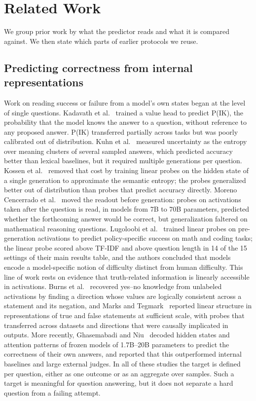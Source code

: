 \documentclass[11pt]{article}
\begin{document}
\section{Related Work}
We group prior work by what the predictor reads and what it is compared against. We then state which parts of earlier protocols we reuse.

\subsection{Predicting correctness from internal representations}
Work on reading success or failure from a model's own states began at the level of single questions. Kadavath et al.~\cite{kadavath2022know} trained a value head to predict P(IK), the probability that the model knows the answer to a question, without reference to any proposed answer.
P(IK) transferred partially across tasks but was poorly calibrated out of distribution. Kuhn et al.~\cite{kuhn2023semantic} measured uncertainty as the entropy over meaning clusters of several sampled answers, which predicted accuracy better than lexical baselines, but it required multiple generations per question.
Kossen et al.~\cite{kossen2024sep} removed that cost by training linear probes on the hidden state of a single generation to approximate the semantic entropy; the probes generalized better out of distribution than probes that predict accuracy directly.
Moreno Cencerrado et al.~\cite{moreno2026noanswer} moved the readout before generation: probes on activations taken after the question is read, in models from 7B to 70B parameters, predicted whether the forthcoming answer would be correct, but generalization faltered on mathematical reasoning questions.
Lugoloobi et al.~\cite{lugoloobi2026failures} trained linear probes on pre-generation activations to predict policy-specific success on math and coding tasks; the linear probe scored above TF-IDF and above question length in 14 of the 15 settings of their main results table, and the authors concluded that models encode a model-specific notion of difficulty distinct from human difficulty. This line of work rests on evidence that truth-related information is linearly accessible in activations. Burns et al.~\cite{burns2022latent} recovered yes--no knowledge from unlabeled activations by finding a direction whose values are logically consistent across a statement and its negation, and Marks and Tegmark~\cite{marks2023geometry} reported linear structure in representations of true and false statements at sufficient scale, with probes that transferred across datasets and directions that were causally implicated in outputs. More recently, Ghasemabadi and Niu~\cite{ghasemabadi2025gnosis} decoded hidden states and attention patterns of frozen models of 1.7B--20B parameters to predict the correctness of their own answers, and reported that this outperformed internal baselines and large external judges. In all of these studies the target is defined per question, either as one outcome or as an aggregate over samples.
Such a target is meaningful for question answering, but it does not separate a hard question from a failing attempt.
\end{document}
